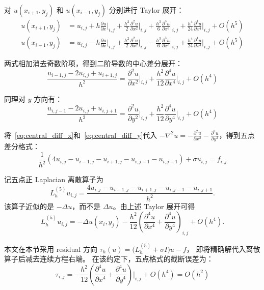 对 $u(x_{i+1}, y_j)$ 和 $u(x_{i-1}, y_j)$ 分别进行 Taylor 展开：
\begin{align}
  u(x_{i+1}, y_j) &= u_{i,j} + h\frac{\partial u}{\partial x}\bigg|_{i,j}
  + \frac{h^2}{2}\frac{\partial^2 u}{\partial x^2}\bigg|_{i,j}
  + \frac{h^3}{6}\frac{\partial^3 u}{\partial x^3}\bigg|_{i,j}
  + \frac{h^4}{24}\frac{\partial^4 u}{\partial x^4}\bigg|_{i,j} + O(h^5) \\
  u(x_{i-1}, y_j) &= u_{i,j} - h\frac{\partial u}{\partial x}\bigg|_{i,j}
  + \frac{h^2}{2}\frac{\partial^2 u}{\partial x^2}\bigg|_{i,j}
  - \frac{h^3}{6}\frac{\partial^3 u}{\partial x^3}\bigg|_{i,j}
  + \frac{h^4}{24}\frac{\partial^4 u}{\partial x^4}\bigg|_{i,j} + O(h^5)
\end{align}

两式相加消去奇数阶项，得到二阶导数的中心差分展开：
\begin{equation}
  \frac{u_{i-1,j} - 2u_{i,j} + u_{i+1,j}}{h^2}
  =
  \frac{\partial^2 u}{\partial x^2}\bigg|_{i,j}
  + \frac{h^2}{12}\frac{\partial^4 u}{\partial x^4}\bigg|_{i,j} + O(h^4)
  \label{eq:central_diff_x}
\end{equation}

同理对 $y$ 方向有：
\begin{equation}
  \frac{u_{i,j-1} - 2u_{i,j} + u_{i,j+1}}{h^2}
  =
  \frac{\partial^2 u}{\partial y^2}\bigg|_{i,j}
  + \frac{h^2}{12}\frac{\partial^4 u}{\partial y^4}\bigg|_{i,j} + O(h^4)
  \label{eq:central_diff_y}
\end{equation}

将~\eqref{eq:central_diff_x}和~\eqref{eq:central_diff_y}代入 $-\nabla^2 u = -\frac{\partial^2 u}{\partial x^2} - \frac{\partial^2 u}{\partial y^2}$，得到五点差分格式：
\begin{equation}
  \frac{1}{h^2}(4u_{i,j} - u_{i-1,j} - u_{i+1,j} - u_{i,j-1} - u_{i,j+1}) + \sigma u_{i,j} = f_{i,j}
  \label{eq:5pt}
\end{equation}

记五点正 Laplacian 离散算子为
\[
L_h^{(5)}u_{i,j}
=
\frac{4u_{i,j}-u_{i-1,j}-u_{i+1,j}-u_{i,j-1}-u_{i,j+1}}{h^2}.
\]
该算子近似的是 $-\Delta u$，而不是 $\Delta u$。由上述 Taylor 展开可得
\[
L_h^{(5)}u_{i,j}
=
-\Delta u(x_i,y_j)
-
\frac{h^2}{12}
\left(
\frac{\partial^4 u}{\partial x^4}
+
\frac{\partial^4 u}{\partial y^4}
\right)_{i,j}
+O(h^4).
\]

本文在本节采用 residual 方向
$\tau_h(u)=\bigl(L_h^{(5)}+\sigma I\bigr)u-f$，
即将精确解代入离散算子后减去连续方程右端。
在该约定下，五点格式的截断误差为：
\begin{equation}
  \tau_{i,j} = -\frac{h^2}{12}\left(\frac{\partial^4 u}{\partial x^4} + \frac{\partial^4 u}{\partial y^4}\right)\bigg|_{i,j} + O(h^4) = O(h^2)
  \label{eq:truncation_5pt}
\end{equation}

